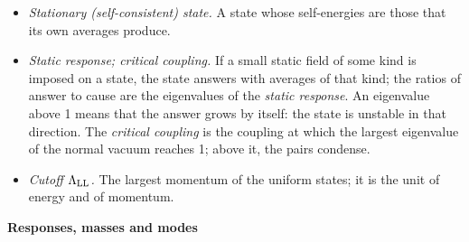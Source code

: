 \documentclass[
  10pt,
]{article}
\begin{document}
\begin{itemize}
  of the revision. \emph{HS} \((s_{\rm S},s_{\rm V})\) is the method of
  Hubbard and Stratonovich at the saddle point: it rewrites the square
  of a bilinear of fields with an auxiliary field, which at the saddle
  point equals the average of the bilinear; the shares \(s_{\rm S}\),
  \(s_{\rm V}\) of the scalar and the vector term are rewritten in
  density channels, the rest in pair channels, and no exchange
  contraction is kept. \emph{KS} is the method of Kohn and Sham of
  density-functional theory, with all three contractions and the
  exchange projected onto local densities. \emph{CJT} is the effective
  action of Cornwall, Jackiw and Tomboulis, a functional of the averages
  of two fields whose stationary points are the self-consistent states,
  with all three contractions. In HS (0,1) and HS (0,0), the
  \emph{pairing-only methods}, only the pairing terms act on the states
  of the revision.
\item
  \emph{Stationary (self-consistent) state.} A state whose self-energies
  are those that its own averages produce.
\item
  \emph{Static response; critical coupling.} If a small static field of
  some kind is imposed on a state, the state answers with averages of
  that kind; the ratios of answer to cause are the eigenvalues of the
  \emph{static response}. An eigenvalue above 1 means that the answer
  grows by itself: the state is unstable in that direction. The
  \emph{critical coupling} is the coupling at which the largest
  eigenvalue of the normal vacuum reaches 1; above it, the pairs
  condense.
\item
  \emph{Cutoff \(\Lambda_{\rm LL}\).} The largest momentum of the
  uniform states; it is the unit of energy and of momentum.
\end{itemize}

\textbf{Responses, masses and modes}
\end{document}
